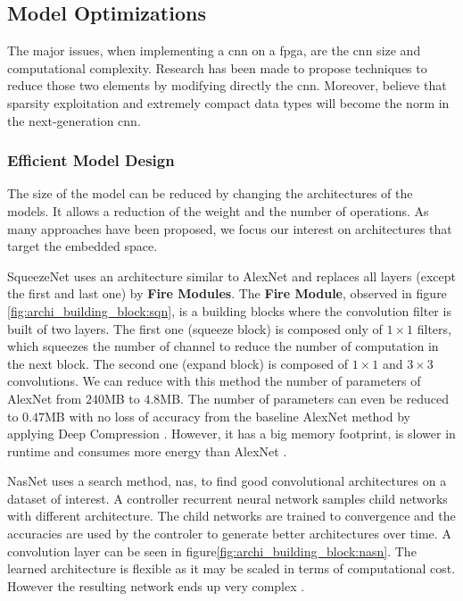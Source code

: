 \subsection{Model Optimizations} \label{subsec:mdopti}
The major issues, when implementing a \acrshort{cnn} on a \acrshort{fpga}, are the \acrshort{cnn} size and computational complexity. Research has been made to propose techniques to reduce those two elements by modifying directly the \acrshort{cnn}. Moreover, \textcite{nurvitadhi_can_2017} believe that sparsity exploitation and extremely compact data types will become the norm in the next-generation \acrshort{cnn}. 
%
%
\subsubsection{Efficient Model Design}
The size of the model can be reduced by changing the architectures of the models. It allows a reduction of the weight and the number of operations. As many approaches have been proposed, we focus our interest on architectures that target the embedded space.

SqueezeNet \cite{iandola_squeezenet_2016} uses an architecture similar to AlexNet and replaces all layers (except the first and last one) by \textbf{Fire Modules}. The \textbf{Fire Module}, observed in figure \ref{fig:archi_building_block:sqn}, is a building blocks where the convolution filter is built of two layers. The first one (squeeze block) is composed only of $1 \times 1$ filters, which squeezes the number of channel to reduce the number of computation in the next block. The second one (expand block) is composed of $1 \times 1$ and $3 \times 3$ convolutions. We can reduce with this method the number of parameters of AlexNet from $240$MB to $4.8$MB. The number of parameters can even be reduced to $0.47$MB with no loss of accuracy from the baseline AlexNet method by applying Deep Compression \cite{han_deep_2016}. However, it has a big memory footprint, is slower in runtime and consumes more energy than AlexNet \cite{sze_efficient_2017}.

NasNet \cite{zoph_learning_2018} uses a search method, \acrfull{nas}, to find good convolutional architectures on a dataset of interest. A controller recurrent neural network samples child networks with different architecture. The child networks are trained to convergence and the accuracies are used by the controler to generate better architectures over time. A convolution layer can be seen in figure\ref{fig:archi_building_block:nasn}. The learned architecture is flexible as it may be scaled in terms of computational cost. However the resulting network ends up very complex \cite{sandler_mobilenetv2_2019}.

